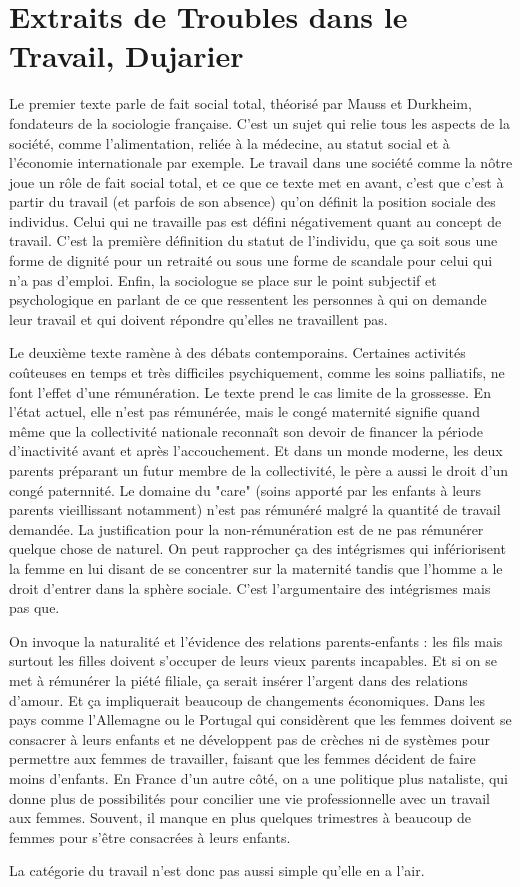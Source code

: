 \documentclass[a4paper,12pt]{book}
\begin{document}
\section{Extraits de Troubles dans le Travail, Dujarier}
Le premier texte parle de fait social total, théorisé par Mauss et Durkheim, fondateurs de la sociologie française. C'est un sujet qui relie tous les aspects de la société, comme l'alimentation, reliée à la médecine, au statut social et à l'économie internationale par exemple. Le travail dans une société comme la nôtre joue un rôle de fait social total, et ce que ce texte met en avant, c'est que c'est à partir du travail (et parfois de son absence) qu'on définit la position sociale des individus. Celui qui ne travaille pas est défini négativement quant au concept de travail. C'est la première définition du statut de l'individu, que ça soit sous une forme de dignité pour un retraité ou sous une forme de scandale pour celui qui n'a pas d'emploi. Enfin, la sociologue se place sur le point subjectif et psychologique en parlant de ce que ressentent les personnes à qui on demande leur travail et qui doivent répondre qu'elles ne travaillent pas.
\par Le deuxième texte ramène à des débats contemporains. Certaines activités coûteuses en temps et très difficiles psychiquement, comme les soins palliatifs, ne font l'effet d'une rémunération. Le texte prend le cas limite de la grossesse. En l'état actuel, elle n'est pas rémunérée, mais le congé maternité signifie quand même que la collectivité nationale reconnaît son devoir de financer la période d'inactivité avant et après l'accouchement. Et dans un monde moderne, les deux parents préparant un futur membre de la collectivité, le père a aussi le droit d'un congé paternnité. Le domaine du "care" (soins apporté par les enfants à leurs parents vieillissant notamment) n'est pas rémunéré malgré la quantité de travail demandée. La justification pour la non-rémunération est de ne pas rémunérer quelque chose de naturel. On peut rapprocher ça des intégrismes qui infériorisent la femme en lui disant de se concentrer sur la maternité tandis que l'homme a le droit d'entrer dans la sphère sociale. C'est l'argumentaire des intégrismes mais pas que.
\par On invoque la naturalité et l'évidence des relations parents-enfants : les fils mais surtout les filles doivent s'occuper de leurs vieux parents incapables. Et si on se met à rémunérer la piété filiale, ça serait insérer l'argent dans des relations d'amour. Et ça impliquerait beaucoup de changements économiques. Dans les pays comme l'Allemagne ou le Portugal qui considèrent que les femmes doivent se consacrer à leurs enfants et ne développent pas de crèches ni de systèmes pour permettre aux femmes de travailler, faisant que les femmes décident de faire moins d'enfants. En France d'un autre côté, on a une politique plus nataliste, qui donne plus de possibilités pour concilier une vie professionnelle avec un travail aux femmes. Souvent, il manque en plus quelques trimestres à beaucoup de femmes pour s'être consacrées à leurs enfants.
\par La catégorie du travail n'est donc pas aussi simple qu'elle en a l'air. 
\end{document}

